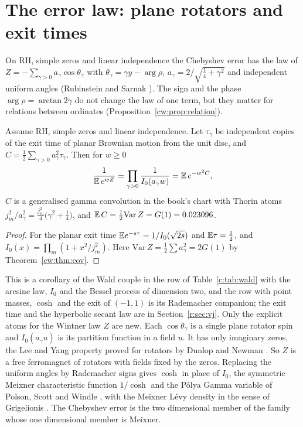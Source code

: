 \section{The error law: plane rotators and exit times}\label{cw:sec:law}

On RH, simple zeros and linear independence the Chebyshev error has the law of $Z=-\sum_{\gamma>0}a_\gamma\cos\theta_\gamma$ with $\theta_\gamma=\gamma y-\arg\rho$, $a_\gamma=2/\sqrt{\frac14+\gamma^2}$ and independent uniform angles (Rubinstein and Sarnak \cite{RubinsteinSarnak94}). The sign and the phase $\arg\rho=\arctan2\gamma$ do not change the law of one term, but they matter for relations between ordinates (Proposition~\ref{cw:prop:relation}).

\begin{proposition}\label{cw:prop:hit}
Assume RH, simple zeros and linear independence. Let $\tau_\gamma$ be independent copies of the exit time of planar Brownian motion from the unit disc, and $C=\frac12\sum_{\gamma>0}a_\gamma^2\tau_\gamma$. Then for $w\ge0$
\[
\frac{1}{\mathbb{E}\,e^{wZ}}=\prod_{\gamma>0}\frac{1}{I_0(a_\gamma w)}=\mathbb{E}\,e^{-w^2C},
\]
$C$ is a generalised gamma convolution in the book's chart with Thorin atoms $j_m^2/a_\gamma^2=\frac{j_m^2}{4}\big(\gamma^2+\frac14\big)$, and $\mathbb{E}\,C=\frac12\mathrm{Var}\,Z=G(1)=0.023096$.
\end{proposition}

\begin{proof}
For the planar exit time $\mathbb{E} e^{-s\tau}=1/I_0(\sqrt{2s})$ and $\mathbb{E}\tau=\frac12$, and $I_0(x)=\prod_m(1+x^2/j_m^2)$. Here $\mathrm{Var}\,Z=\frac12\sum a_\gamma^2=2G(1)$ by Theorem~\ref{cw:thm:cov}.
\end{proof}

This is a corollary of the Wald couple in the row of Table~\ref{c:tab:wald} with the arcsine law, $I_0$ and the Bessel process of dimension two, and the row with point masses, $\cosh$ and the exit of $(-1,1)$ is its Rademacher companion; the exit time and the hyperbolic secant law are in Section~\ref{r:sec:vj}. Only the explicit atoms for the Wintner law $Z$ are new. Each $\cos\theta_\gamma$ is a single plane rotator spin and $I_0(a_\gamma u)$ is its partition function in a field $u$. It has only imaginary zeros, the Lee and Yang property proved for rotators by Dunlop and Newman \cite{DunlopNewman75}. So $Z$ is a free ferromagnet of rotators with fields fixed by the zeros. Replacing the uniform angles by Rademacher signs gives $\cosh$ in place of $I_0$, the symmetric Meixner characteristic function $1/\cosh$ and the P\'olya Gamma variable of Polson, Scott and Windle \cite{PSW13}, with the Meixner L\'evy density in the sense of Grigelionis \cite{Grigelionis99}. The Chebyshev error is the two dimensional member of the family whose one dimensional member is Meixner.

